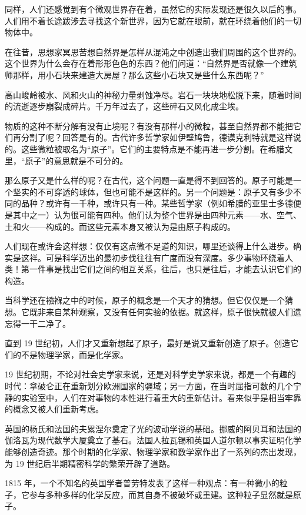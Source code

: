 同样，人们还感觉到有个微观世界存在着，虽然它的实际发现还是很久以后的事。人们用不着长途跋涉去寻找这个新世界，因为它就在眼前，就在环绕着他们的一切物体中。

在往昔，思想家冥思苦想自然界是怎样从混沌之中创造出我们周围的这个世界的。这个世界为什么会存在着形形色色的东西？他们问道：“自然界是否就像一个建筑师那样，用小石块来建造大房屋？那么这些小石块又是些什么东西呢？”

高山峻岭被水、风和火山的神秘力量剥蚀净尽。岩石一块块地松脱下来，随着时间的流逝逐步崩裂成碎片。千万年过去了，这些碎石又风化成尘埃。

物质的这种不断分解有没有止境呢？有没有那样小的微粒，甚至自然界都不能把它们再分割了呢？回答是有的。古代许多哲学家如伊壁鸠鲁，德谟克利特就是这样说的。这些微粒被取名为“原子”。它们的主要特点是不能再进一步分割。在希腊文里，“原子”的意思就是不可分的。

那么原子又是什么样的呢？在古代，这个问题一直是得不到回答的。原子可能是一个坚实的不可穿透的球体，但也可能不是这样的。另一个问题是：原子又有多少不同的品种？或许有一千种，或许只有一种。某些哲学家（例如希腊的亚里士多德便是其中之一）认为很可能有四种。他们认为整个世界是由四种元素——水、空气、土和火——构成的。而这些元素本身又被认为是由原子构成的。

人们现在或许会这样想：仅仅有这点微不足道的知识，哪里还谈得上什么进步。确实是这祥。可是科学迈出的最初步伐往往有广度而没有深度。多少事物环绕着人类！第一件事是找出它们之间的相互关系，往后，也只是往后，才能去认识它们的构造。

当科学还在襁褓之中的时候，原子的概念是一个天才的猜想。但它仅仅是一个猜想。它既非来自某种观察，又没有任何实验的依据。就这样，原子很快就被人们遗忘得一干二净了。

直到 19 世纪初，人们才又重新想起了原子，最好是说又重新创造了原子。创造它们的不是物理学家，而是化学家。

19 世纪初期，不论对社会史学家来说，还是对科学史学家来说，都是一个有趣的时代：拿破仑正在重新划分欧洲国家的疆域；另一方面，在当时屈指可数的几个宁静的实验室中，人们在对事物的本性进行着重大的重新估计。看来似乎是相当牢靠的概念又被人们重新考虑。

英国的杨氏和法国的夫累涅尔奠定了光的波动学说的基础。挪威的阿贝耳和法国的伽洛瓦为现代数学大厦奠立了基石。法国人拉瓦锡和英国人道尔顿以事实证明化学能够创造奇迹。那个时期的化学家、物理学家和数学家作出了一系列的杰出发现，为 19 世纪后半期精密科学的繁荣开辟了道路。

1815 年，一个不知名的英国学者普劳特发表了这样一种观点：有一种微小的粒子，它参与多种多样的化学反应，而其自身不被破坏或重建。这种粒子显然就是原子。

